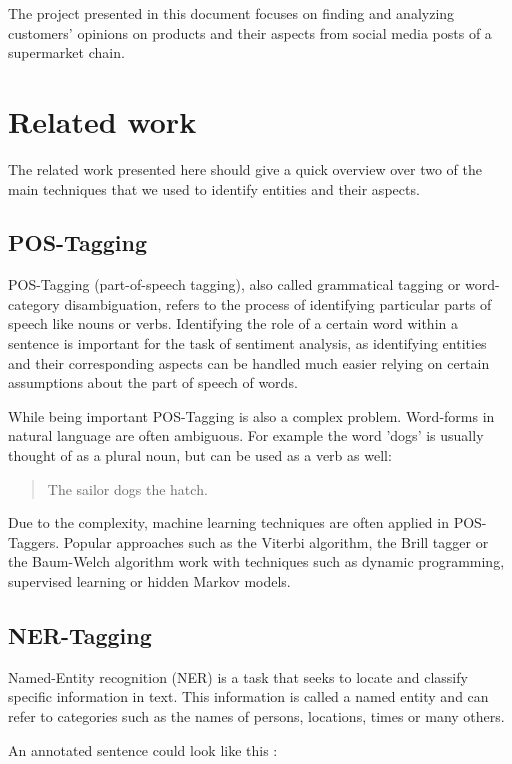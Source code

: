 \documentclass[10pt,a4paper]{article}
\begin{document}
	The project presented in this document focuses on finding and analyzing customers' opinions on products and their aspects from social media posts of a supermarket chain.
	
	\section{Related work}
	The related work presented here should give a quick overview over two of the main techniques that we used to identify entities and their aspects.
		
		\subsection{POS-Tagging}
		POS-Tagging (part-of-speech tagging), also called grammatical tagging or word-category disambiguation, refers to the process of identifying particular parts of speech like nouns or verbs. Identifying the role of a certain word within a sentence is important for the task of sentiment analysis, as identifying entities and their corresponding aspects can be handled much easier relying on certain assumptions about the part of speech of words.
		
		While being important POS-Tagging is also a complex problem. Word-forms in natural language are often ambiguous. For example the word 'dogs' is usually thought of as a plural noun, but can be used as a verb as well:

		\begin{quote}
			The sailor dogs the hatch.
		\end{quote}

		Due to the complexity, machine learning techniques are often applied in POS-Taggers. Popular approaches such as the Viterbi algorithm, the Brill tagger or the Baum-Welch algorithm work with techniques such as dynamic programming, supervised learning or hidden Markov models.
		
		\subsection{NER-Tagging}
		
		Named-Entity recognition (NER) is a task that seeks to locate and classify specific information in text. This information is called a named entity and can refer to categories such as the names of persons, locations, times or many others.

		An annotated sentence could look like this :
\end{document}
